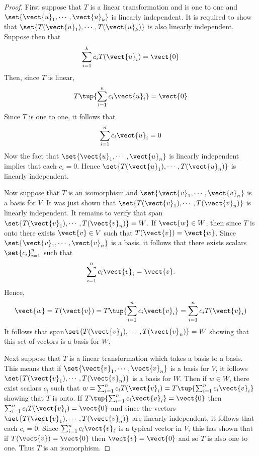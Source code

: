 \begin{proof}First suppose that $T$ is a linear transformation and is one to one
and $\set{\vect{u}_{1},\cdots ,\vect{u}_{k}} $ is linearly
independent. It is required to show that $\set{T(\vect{u}_{1}),\cdots ,T(\vect{
u}_{k})} $ is also linearly independent. Suppose then that 
\begin{equation*}
\sum_{i=1}^{k}c_{i}T(\vect{u}_{i})=\vect{0}
\end{equation*}
Then, since $T$ is linear, 
\begin{equation*}
T\tup{\sum_{i=1}^{n}c_{i}\vect{u}_{i}} =\vect{0}
\end{equation*}
Since $T$ is one to one, it follows that 
\begin{equation*}
\sum_{i=1}^{n}c_{i}\vect{u}_{i}=0
\end{equation*}
Now the fact that $\set{\vect{u}_{1},\cdots ,\vect{u}_{n}} $ is
linearly independent implies that each $c_{i}=0$. Hence $\set{T(\vect{u}
_{1}),\cdots ,T(\vect{u}_{n})} $ is linearly independent.

Now suppose that $T$ is an isomorphism and $\set{\vect{v}_{1},\cdots ,\vect{
v}_{n}} $ is a basis for $V$. It was just shown that $\set{T(\vect{v}
_{1}),\cdots ,T(\vect{v}_{n})} $ is linearly independent. It remains to
verify that span$\set{T(\vect{v}_{1}),\cdots ,T(\vect{v}_{n})}=W$. If $\vect{w}\in W$, then since $T$ is onto there
exists $\vect{v}\in V$ such that $T(\vect{v})=\vect{w}$. Since $\set{\vect{v}
_{1},\cdots ,\vect{v}_{n}} $ is a basis, it follows that there exists
scalars $\set{c_{i}} _{i=1}^{n}$ such that 
\begin{equation*}
\sum_{i=1}^{n}c_{i}\vect{v}_{i}=\vect{v}.
\end{equation*}
Hence, 
\begin{equation*}
\vect{w}=T(\vect{v})=T\tup{\sum_{i=1}^{n}c_{i}\vect{v}_{i}}
=\sum_{i=1}^{n}c_{i}T(\vect{v}_{i})
\end{equation*}
It follows that span$\set{T(\vect{v}_{1}),\cdots , T(\vect{v}_{n})} =W$ showing that this set of vectors is a
basis for $W$.

Next suppose that $T$ is a linear transformation which takes a basis to a basis. This means that if $\set{\vect{v}_{1},\cdots ,\vect{v}_{n}} $ is a basis for $V$, it
follows $\set{T(\vect{v}_{1}),\cdots ,T(\vect{v}_{n})} $ is a basis for $
W$. Then if $w\in W$, there exist scalars $c_{i}$ such that $
w=\sum_{i=1}^{n}c_{i}T(\vect{v}_{i})=T\tup{\sum_{i=1}^{n}c_{i}\vect{v}_{i}} $
showing that $T$ is onto. If $T\tup{\sum_{i=1}^{n}c_{i}\vect{v}_{i}} =\vect{0}$
then $\sum_{i=1}^{n}c_{i}T(\vect{v}_{i})=\vect{0}$ and since the vectors $\set{T(\vect{v}
_{1}),\cdots ,T(\vect{v}_{n})} $ are linearly independent, it follows
that each $c_{i}=0$. Since $\sum_{i=1}^{n}c_{i}\vect{v}_{i}$ is a typical vector in 
$V$, this has shown that if $T(\vect{v})=\vect{0}$ then $\vect{v}=\vect{0}$ and so $T$ is also one to one.
Thus $T$ is an isomorphism. 
\end{proof}

